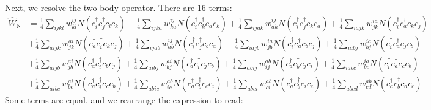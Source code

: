 \documentclass{report}
\theoremstyle{plain}
\theoremstyle{definition}
\begin{document}
Next, we resolve the two-body operator. There are 16 terms:
\begin{equation}
  \begin{split}
    \hat{W}_\text{N} &= \frac{1}{4}\sum_{ijkl} w^{ij}_{kl} N(c^\dag_i
    c^\dag_j c_l c_k) + \frac{1}{4}\sum_{ijka} w^{ij}_{ka} N(c^\dag_i
    c^\dag_k c_a c_k) + \frac{1}{4}\sum_{ijak} w^{ij}_{ak} N(c^\dag_i
    c^\dag_j c_k c_a) + \frac{1}{4}\sum_{iajk} w^{ia}_{jk} N(c^\dag_i
    c^\dag_a c_k c_j) \\ & + \frac{1}{4}\sum_{aijk} w^{ai}_{jk}
    N(c^\dag_a c^\dag_i c_k c_j) + \frac{1}{4}\sum_{ijab} w^{ij}_{ab}
    N(c^\dag_i c^\dag_j c_b c_a) + \frac{1}{4}\sum_{iajb} w^{ia}_{jb}
    N(c^\dag_i c^\dag_a c_b c_j)
    + \frac{1}{4}\sum_{iabj} w^{ia}_{bj} N(c^\dag_i c^\dag_a c_j c_b) \\
    & + \frac{1}{4} \sum_{aijb}w^{ai}_{jb} N(c^\dag_a c^\dag_i c_b
    c_j) + \frac{1}{4}\sum_{aibj}w^{ai}_{bj} N(c^\dag_a c^\dag_i
    c_j c_b) +
    \frac{1}{4}\sum_{abij}w^{ab}_{ij}  N(c^\dag_a c^\dag_b c_j c_i)
     +\frac{1}{4}\sum_{iabc} w^{ia}_{bc} N(c^\dag_i c^\dag_a c_c c_b) \\
    &+\frac{1}{4}\sum_{aibc} w^{ai}_{bc} N( c^\dag_a c^\dag_i c_c c_b)
    +\frac{1}{4}\sum_{abic} w^{ab}_{ic} N(c^\dag_a c^\dag_b c_c
    c_i) +\frac{1}{4}\sum_{abci} w^{ab}_{ci} N(c^\dag_a c^\dag_b
    c_i c_c) + \frac{1}{4}\sum_{abcd} w^{ab}_{cd} N(c^\dag_a c^\dag_b
    c_d c_c) \label{eq:G2qp-pre}
\end{split}
\end{equation}
Some terms are equal, and we rearrange the expression to read:
\end{document}
